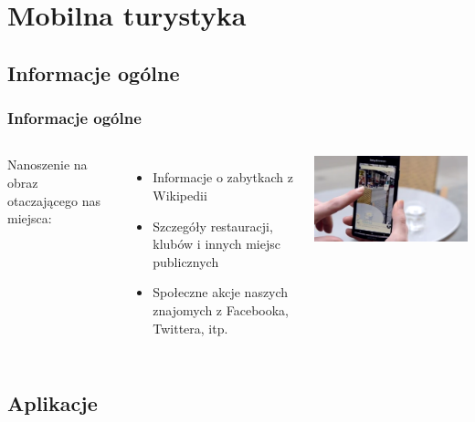 \section{Mobilna turystyka}
\nextoc

\subsection{Informacje ogólne}
\begin{frame}
    \frametitle{Informacje ogólne}

\begin{columns}
Nanoszenie na obraz otaczającego nas miejsca: 
\begin{itemize}
\item Informacje o zabytkach z Wikipedii
\item Szczegóły restauracji, klubów i innych miejsc publicznych
\item Społeczne akcje naszych znajomych z Facebooka, Twittera, itp.
\end{itemize}
\includegraphics[width=\textwidth]{tourism_1}
\end{columns}
\end{frame}

\subsection{Aplikacje}
